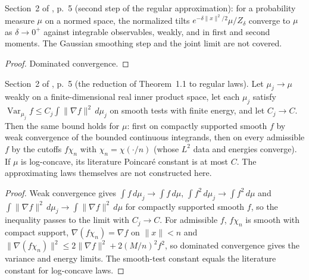 \begin{lemma}
  \label{lem:bkl-quadratic-tilt}
  \leanok
  Section~2 of \cite{BizeulKlartagLehec2026}, p.~5 (second step of the regular approximation):
  for a probability measure $\mu$ on a normed space, the normalized tilts
  $e^{-\delta\|x\|^2/2}\mu/Z_\delta$ converge to $\mu$ as $\delta\to0^+$ against integrable
  observables, weakly, and in first and second moments. The Gaussian smoothing step and the
  joint limit are not covered.
\end{lemma}
\begin{proof}
  \leanok
  Dominated convergence.
\end{proof}

\begin{lemma}
  \label{lem:bkl-weak-limit-transfer}
  \leanok
  Section~2 of \cite{BizeulKlartagLehec2026}, p.~5 (the reduction of Theorem~1.1 to regular laws).
  Let $\mu_j\to\mu$ weakly on a finite-dimensional real inner product space, let each $\mu_j$
  satisfy $\operatorname{Var}_{\mu_j}f\le C_j\int\|\nabla f\|^2\,d\mu_j$ on smooth tests with
  finite energy, and let $C_j\to C$. Then the same bound holds for $\mu$: first on compactly
  supported smooth $f$ by weak convergence of the bounded continuous integrands, then on every
  admissible $f$ by the cutoffs $f\chi_{n}$ with $\chi_n=\chi(\cdot/n)$ (whose $L^2$ data and
  energies converge). If $\mu$ is log-concave, its literature Poincaré constant is at most $C$.
  The approximating laws themselves are not constructed here.
\end{lemma}
\begin{proof}
  \leanok
  Weak convergence gives $\int f\,d\mu_j\to\int f\,d\mu$, $\int f^2\,d\mu_j\to\int f^2\,d\mu$ and
  $\int\|\nabla f\|^2\,d\mu_j\to\int\|\nabla f\|^2\,d\mu$ for compactly supported smooth $f$, so the
  inequality passes to the limit with $C_j\to C$. For admissible $f$, $f\chi_n$ is smooth with
  compact support, $\nabla(f\chi_n)=\nabla f$ on $\|x\|<n$ and
  $\|\nabla(f\chi_n)\|^2\le2\|\nabla f\|^2+2(M/n)^2f^2$, so dominated convergence gives the
  variance and energy limits. The smooth-test constant equals the literature constant for
  log-concave laws.
\end{proof}

